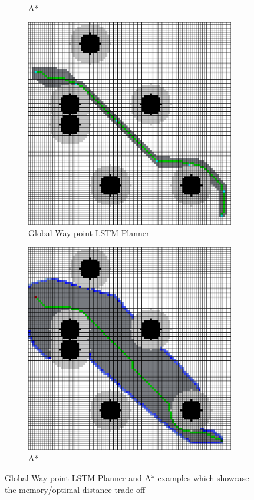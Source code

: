 \begin{figure}[h]
\begin{subfigure}[b]{0.48\linewidth}
    \caption{A*}
  \end{subfigure}
  \newline
  \begin{subfigure}[b]{0.48\linewidth}
    \includegraphics[width=\linewidth]{images/screenshot_104.png}
    \caption{Global Way-point LSTM Planner}
  \end{subfigure}
  \hfill
  \begin{subfigure}[b]{0.48\linewidth}
    \includegraphics[width=\linewidth]{images/screenshot_105.png}
    \caption{A*}
  \end{subfigure}
  \caption{Global Way-point LSTM Planner and A* examples which showcase the memory/optimal distance trade-off}
  \label{fig: comparison_a*_waypoint}
\end{figure}

\pagebreak

